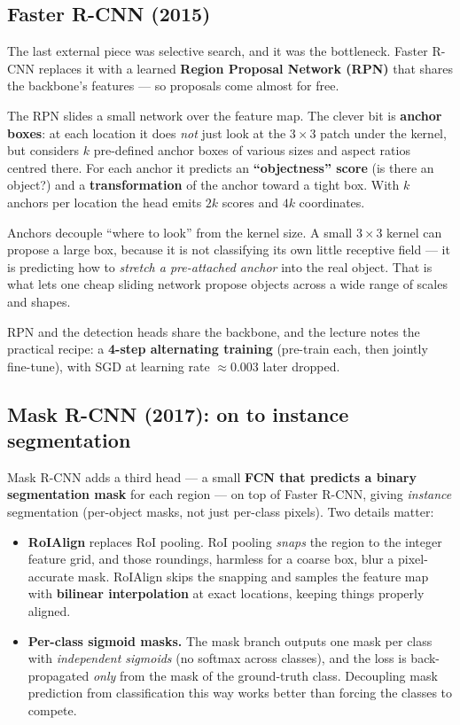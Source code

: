 \documentclass[11pt, oneside]{book}
\begin{document}
\subsection{Faster R-CNN (2015)}

The last external piece was selective search, and it was the bottleneck. Faster
R-CNN replaces it with a learned \textbf{Region Proposal Network (RPN)} that
shares the backbone's features --- so proposals come almost for free.

The RPN slides a small network over the feature map. The clever bit is
\textbf{anchor boxes}: at each location it does \emph{not} just look at the
$3\times3$ patch under the kernel, but considers $k$ pre-defined anchor boxes of
various sizes and aspect ratios centred there. For each anchor it predicts an
\textbf{``objectness'' score} (is there an object?) and a \textbf{transformation}
of the anchor toward a tight box. With $k$ anchors per location the head emits
$2k$ scores and $4k$ coordinates.

\begin{intbox}
Anchors decouple ``where to look'' from the kernel size. A small $3\times3$
kernel can propose a large box, because it is not classifying its own little
receptive field --- it is predicting how to \emph{stretch a pre-attached anchor}
into the real object. That is what lets one cheap sliding network propose objects
across a wide range of scales and shapes.
\end{intbox}

RPN and the detection heads share the backbone, and the lecture notes the
practical recipe: a \textbf{4-step alternating training} (pre-train each, then
jointly fine-tune), with SGD at learning rate $\approx 0.003$ later dropped.

\subsection{Mask R-CNN (2017): on to instance segmentation}

Mask R-CNN adds a third head --- a small \textbf{FCN that predicts a binary
segmentation mask} for each region --- on top of Faster R-CNN, giving
\emph{instance} segmentation (per-object masks, not just per-class pixels). Two
details matter:

\begin{itemize}
  \item \textbf{RoIAlign} replaces RoI pooling. RoI pooling \emph{snaps} the
        region to the integer feature grid, and those roundings, harmless for a
        coarse box, blur a pixel-accurate mask. RoIAlign skips the snapping and
        samples the feature map with \textbf{bilinear interpolation} at exact
        locations, keeping things properly aligned.
  \item \textbf{Per-class sigmoid masks.} The mask branch outputs one mask per
        class with \emph{independent sigmoids} (no softmax across classes), and the
        loss is back-propagated \emph{only} from the mask of the ground-truth class.
        Decoupling mask prediction from classification this way works better than
        forcing the classes to compete.
\end{itemize}
\end{document}
